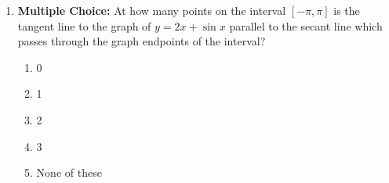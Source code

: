 \documentclass[12pt]{article}
\newif\ifans
\begin{document}
\begin{enumerate}
\ifans{\fbox{\parbox{1\linewidth}{$f^{\prime}(x)=\cos{x}-x^2$.  Firstly, notice that $f^{\prime}(x)$ is continuous for all $x$; therefore, it is continuous for all $x$ in $[0,1]$.  Secondly, notice that $f^{\prime}(0)=1>0$ and $f^{\prime}(1)=\cos{(1)}-1<0$.  Thus, the Intermediate Value Theorem states there is at least one $x_0$ in the interval $(0,1)$ with $f^{\prime}(x_0)=0$.  In other words, there is at least one $x_0$ in $(0,1)$ where $f(x)$ will have a horizontal tangent line.}}} \fi

\item {\bf Multiple Choice:} At how many points on the interval $[-\pi,\pi]$ is the tangent line to the graph of $y=2x+\sin{x}$ parallel to the secant line which passes through the graph endpoints of the interval?

\begin{enumerate}

\item 0

\item 1

\item 2

\item 3

\item None of these

\end{enumerate}

\ifans{\fbox{C}} \fi

\end{enumerate}
\end{document}

